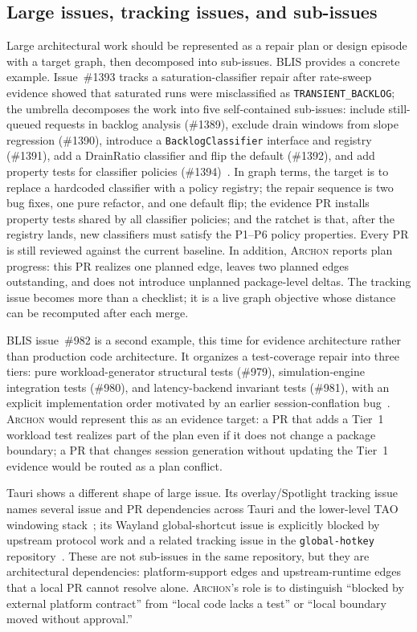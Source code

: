 \documentclass[sigconf,review,anonymous]{acmart}
\theoremstyle{plain}
\theoremstyle{definition}
\begin{document}
\subsection{Large issues, tracking issues, and sub-issues}

Large architectural work should be represented as a repair plan or design
episode with a target graph, then decomposed into sub-issues. BLIS provides a
concrete example. Issue~\#1393 tracks a saturation-classifier repair after
rate-sweep evidence showed that saturated runs were misclassified as
\texttt{TRANSIENT\_BACKLOG}; the umbrella decomposes the work into five
self-contained sub-issues: include still-queued requests in backlog analysis
(\#1389), exclude drain windows from slope regression (\#1390), introduce a
\texttt{Backlog\allowbreak Classifier} interface and registry (\#1391), add a DrainRatio
classifier and flip the default (\#1392), and add property tests for classifier
policies (\#1394)~\cite{blissaturationtracking}. In graph terms, the target is
to replace a hardcoded classifier with a policy registry; the repair sequence is
two bug fixes, one pure refactor, and one default flip; the evidence PR installs
property tests shared by all classifier policies; and the ratchet is that, after
the registry lands, new classifiers must satisfy the P1--P6 policy properties.
Every PR is still reviewed against the current baseline. In addition, \textsc{Archon}
reports plan progress: this PR realizes one planned edge, leaves two planned
edges outstanding, and does not introduce unplanned package-level deltas. The
tracking issue becomes more than a checklist; it is a live graph objective whose
distance can be recomputed after each merge.

BLIS issue~\#982 is a second example, this time for evidence architecture rather
than production code architecture. It organizes a test-coverage repair into
three tiers: pure workload-generator structural tests (\#979),
simulation-engine integration tests (\#980), and latency-backend invariant tests
(\#981), with an explicit implementation order motivated by an earlier
session-conflation bug~\cite{blistestcoverage}. \textsc{Archon} would represent
this as an evidence target: a PR that adds a Tier~1 workload test realizes part
of the plan even if it does not change a package boundary; a PR that changes
session generation without updating the Tier~1 evidence would be routed as a
plan conflict.

Tauri shows a different shape of large issue. Its overlay/Spotlight tracking
issue names several issue and PR dependencies across Tauri and the lower-level
TAO windowing stack~\cite{taurioverlaytracking}; its Wayland global-shortcut
issue is explicitly blocked by upstream protocol work and a related tracking
issue in the \texttt{global-hotkey} repository~\cite{tauriwaylandshortcut}. These
are not sub-issues in the same repository, but they are architectural
dependencies: platform-support edges and upstream-runtime edges that a local PR
cannot resolve alone. \textsc{Archon}'s role is to distinguish ``blocked by
external platform contract'' from ``local code lacks a test'' or ``local
boundary moved without approval.''
\end{document}
